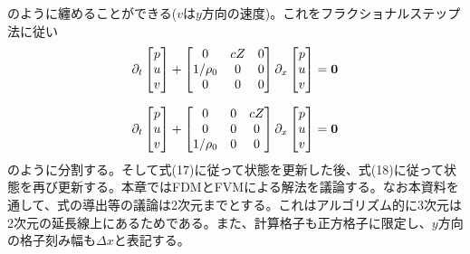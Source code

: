 \documentclass[dvipdfmx, 9pt, a4paper]{jsarticle}
\newcommand{\bm}[1]{{\mbox{\boldmath $#1$}}}
\begin{document}
のように纏めることができる($v$は$y$方向の速度)。これをフラクショナルステップ法に従い
\begin{equation}
\partial_t
\begin{bmatrix}
p \\ u \\ v
\end{bmatrix}
+
\begin{bmatrix}
0 & cZ & 0 \\
1/\rho_0 & 0 & 0 \\
0 & 0 & 0 \\ 
\end{bmatrix}
\partial_x
\begin{bmatrix}
p \\ u \\ v
\end{bmatrix}=\bm 0
\end{equation}

\begin{equation}
\partial_t
\begin{bmatrix}
p \\ u \\ v
\end{bmatrix}
+
\begin{bmatrix}
0 & 0 & cZ \\
0 & 0 & 0 \\
1/\rho_0 & 0 & 0 \\ 
\end{bmatrix}
\partial_x
\begin{bmatrix}
p \\ u \\ v
\end{bmatrix}=\bm 0
\end{equation}
のように分割する。そして式(17)に従って状態を更新した後、式(18)に従って状態を再び更新する。本章ではFDMとFVMによる解法を議論する。なお本資料を通して、式の導出等の議論は2次元までとする。これはアルゴリズム的に3次元は2次元の延長線上にあるためである。また、計算格子も正方格子に限定し、$y$方向の格子刻み幅も$\Delta x$と表記する。
\end{document}
